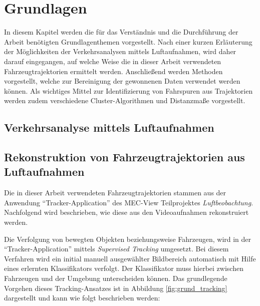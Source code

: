 
\chapter{Grundlagen}
\label{cha:grundlagen}

In diesem Kapitel werden die für das Verständnis und die Durchführung der Arbeit benötigten
Grundlagenthemen vorgestellt. Nach einer kurzen Erläuterung der Möglichkeiten der Verkehrsanalysen
mittels Luftaufnahmen, wird daher darauf eingegangen, auf welche Weise die in dieser Arbeit verwendeten
Fahrzeugtrajektorien ermittelt werden.
Anschließend werden Methoden vorgestellt, welche zur Bereinigung der gewonnenen Daten verwendet werden können.
Als wichtiges Mittel zur Identifizierung von Fahrspuren aus Trajektorien werden zudem
verschiedene Cluster-Algorithmen und Distanzmaße vorgestellt.

\section{Verkehrsanalyse mittels Luftaufnahmen}
\label{sec:traffic_analysis}


\section{Rekonstruktion von Fahrzeugtrajektorien aus Luftaufnahmen}
\label{sec:position_extraction}


Die in dieser Arbeit verwendeten Fahrzeugtrajektorien stammen aus der Anwendung ``Tracker-Application''
des MEC-View Teilprojektes \textit{Luftbeobachtung}. Nachfolgend wird beschrieben, wie diese aus den Videoaufnahmen
rekonstruiert werden.

Die Verfolgung von bewegten Objekten beziehungsweise Fahrzeugen, wird in der ``Tracker-Application'' mittels
\textit{Supervised Tracking} umgesetzt. Bei diesem Verfahren wird ein initial manuell ausgewählter Bildbereich
automatisch mit Hilfe eines erlernten Klassifikators verfolgt. Der Klassifikator muss hierbei zwischen
Fahrzeugen und der Umgebung unterscheiden können.
Das grundlegende Vorgehen dieses Tracking-Ansatzes ist in Abbildung \ref{fig:grund_tracking}
dargestellt und kann wie folgt beschrieben werden:

